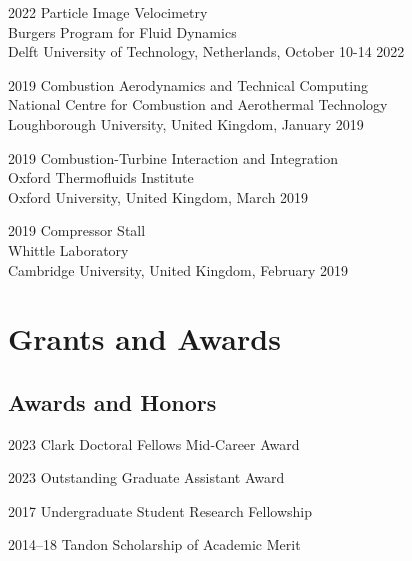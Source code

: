 \documentclass[12pt,letterpaper]{report}
\begin{document}
	\begin{tablist}
	
	\item[2022] \tab{}Particle Image Velocimetry \\ 
	Burgers Program for Fluid Dynamics \\
	Delft University of Technology, Netherlands, October 10-14 2022 
	
	\item[2019] \tab{}Combustion Aerodynamics and Technical Computing \\
	National Centre for Combustion and Aerothermal Technology \\
	Loughborough University, United Kingdom, January 2019
	
	\item[2019] \tab{}Combustion-Turbine Interaction and Integration \\ 
	Oxford Thermofluids Institute \\
	Oxford University, United Kingdom, March 2019
	
	\item[2019] \tab{}Compressor Stall \\ 
	Whittle Laboratory \\
	Cambridge University, United Kingdom, February 2019
	
	
	\end{tablist}

    \section*{Grants and Awards}

    \subsection*{Awards and Honors}

    \begin{tablist}
\item[2023] \tab{}Clark Doctoral Fellows Mid-Career Award 

\item[2023] \tab{}Outstanding Graduate Assistant Award


        \item[2017] \tab{}Undergraduate Student Research Fellowship
        \item[2014--18] \tab{}Tandon Scholarship of Academic Merit

    \end{tablist}
\end{document}
